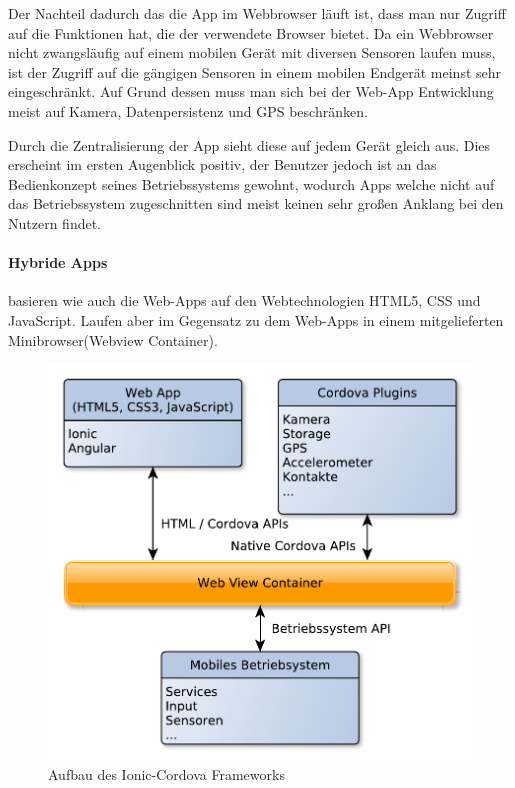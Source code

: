 Der Nachteil dadurch das die App im Webbrowser läuft ist, dass man nur Zugriff auf die Funktionen hat, die der verwendete Browser bietet. Da ein Webbrowser nicht zwangsläufig auf einem mobilen Gerät mit diversen Sensoren laufen muss, ist der Zugriff auf die gängigen Sensoren in einem mobilen Endgerät meinst sehr eingeschränkt. Auf Grund dessen muss man sich bei der Web-App Entwicklung meist auf Kamera, Datenpersistenz und GPS beschränken.

Durch die Zentralisierung der App sieht diese auf jedem Gerät gleich aus. Dies erscheint im ersten Augenblick positiv, der Benutzer jedoch ist an das Bedienkonzept seines Betriebssystems gewohnt, wodurch Apps welche nicht auf das Betriebssystem zugeschnitten sind meist keinen sehr großen Anklang bei den Nutzern findet. 


\paragraph{Hybride Apps}\label{Hybride Apps} basieren wie auch die Web-Apps auf den Webtechnologien HTML5, CSS und JavaScript. Laufen aber im Gegensatz zu dem Web-Apps in einem mitgelieferten Minibrowser(Webview Container).

\begin{figure}[H]
	\centering
	\includegraphics[scale=0.8]{images/IonicCordova}
	\caption[Aufbau des Ionic-Cordova Frameworks]{Aufbau des Ionic-Cordova Frameworks}
	\label{IonicCordova}
\end{figure}

